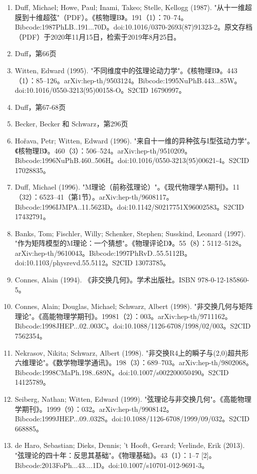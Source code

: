 \begin{enumerate}
\item Duff, Michael; Howe, Paul; Inami, Takeo; Stelle, Kellogg (1987). "从十一维超膜到十维超弦"（PDF）。《核物理B》。191（1）：70–74。Bibcode:1987PhLB..191...70D。doi:10.1016/0370-2693(87)91323-2。原文存档（PDF）于2020年11月15日，检索于2019年8月25日。  
\item Duff，第66页  
\item Witten, Edward (1995). "不同维度中的弦理论动力学"。《核物理B》。443（1）：85–126。arXiv:hep-th/9503124。Bibcode:1995NuPhB.443...85W。doi:10.1016/0550-3213(95)00158-O。S2CID 16790997。
\item Duff，第67-68页  
\item Becker, Becker 和 Schwarz，第296页  
\item Hořava, Petr; Witten, Edward (1996). "来自十一维的异种弦与I型弦动力学"。《核物理B》。460（3）：506–524。arXiv:hep-th/9510209。Bibcode:1996NuPhB.460..506H。doi:10.1016/0550-3213(95)00621-4。S2CID 17028835。  
\item Duff, Michael (1996). "M理论（前称弦理论）"。《现代物理学A期刊》。11（32）：6523–41（第1节）。arXiv:hep-th/9608117。Bibcode:1996IJMPA..11.5623D。doi:10.1142/S0217751X96002583。S2CID 17432791。  
\item Banks, Tom; Fischler, Willy; Schenker, Stephen; Susskind, Leonard (1997). "作为矩阵模型的M理论：一个猜想"。《物理评论D》。55（8）：5112–5128。arXiv:hep-th/9610043。Bibcode:1997PhRvD..55.5112B。doi:10.1103/physrevd.55.5112。S2CID 13073785。  
\item Connes, Alain (1994). 《非交换几何》。学术出版社。ISBN 978-0-12-185860-5。  
\item Connes, Alain; Douglas, Michael; Schwarz, Albert (1998). "非交换几何与矩阵理论"。《高能物理学期刊》。19981（2）：003。arXiv:hep-th/9711162。Bibcode:1998JHEP...02..003C。doi:10.1088/1126-6708/1998/02/003。S2CID 7562354。
\item Nekrasov, Nikita; Schwarz, Albert (1998). "非交换R4上的瞬子与(2,0)超共形六维理论"。《数学物理学通讯》。198（3）：689–703。arXiv:hep-th/9802068。Bibcode:1998CMaPh.198..689N。doi:10.1007/s002200050490。S2CID 14125789。  
\item Seiberg, Nathan; Witten, Edward (1999). "弦理论与非交换几何"。《高能物理学期刊》。1999（9）：032。arXiv:hep-th/9908142。Bibcode:1999JHEP...09..032S。doi:10.1088/1126-6708/1999/09/032。S2CID 668885。  
\item de Haro, Sebastian; Dieks, Dennis; 't Hooft, Gerard; Verlinde, Erik (2013). "弦理论的四十年：反思其基础"。《物理基础》。43（1）：1–7 [2]。Bibcode:2013FoPh...43....1D。doi:10.1007/s10701-012-9691-3。  

\end{enumerate}
